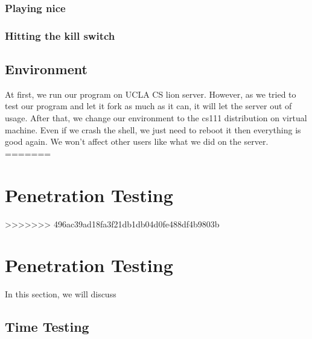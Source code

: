 \documentclass{article}
\begin{document}
\subsubsection{Playing nice}
\subsubsection{Hitting the kill switch}

\subsection{Environment}
At first, we run our program on UCLA CS lion server.  However, as we tried to test our program and let it fork as much as it can, it will let the server out of usage.  After that, we change our environment to the cs111 distribution on virtual machine.  Even if we crash the shell, we just need to reboot it then everything is good again.  We won’t affect other users like what we did on the server. \\ 
=======
\section{Penetration Testing}
>>>>>>> 496ac39ad18fa3f21db1db04d0fe488df4b9803b


\section{Penetration Testing}

In this section, we will discuss 

\subsection{Time Testing}


\end{document}
